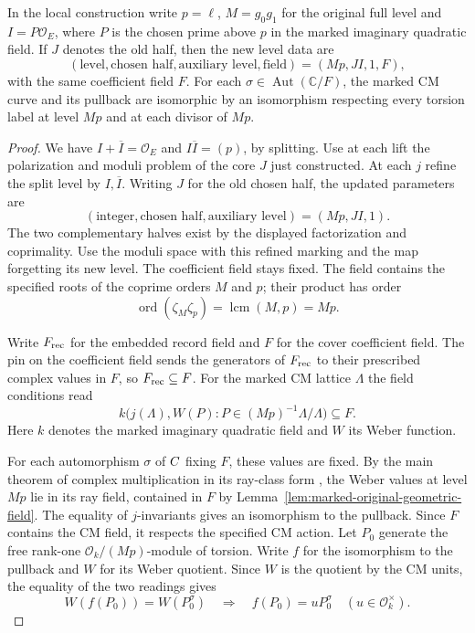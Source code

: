 \begin{established}\label{hyp:split-section-refinement}
In the local construction write \(p=\ell\), \(M=g_0g_1\) for
the original full level and \(I=P\mathcal O_E\), where \(P\)
is the chosen prime above \(p\) in the marked imaginary
quadratic field. If \(J\) denotes the old half, then the new level data are
\[
 (\text{level},\text{chosen half},\text{auxiliary level},\text{field})
                       =(Mp,JI,1,F),
\]
with the same coefficient field \(F\). For each \(\sigma\in\operatorname{Aut}(\mathbb C/F)\), the marked CM curve and its pullback are isomorphic by an isomorphism respecting every torsion label at level \(Mp\) and at each divisor of \(Mp\).
\end{established}
\begin{proof}
We have \(I+\overline I=\mathcal O_E\) and
\(I\overline I=(p)\), by splitting. Use at each lift the
polarization and moduli problem of the core \(J\) just constructed.
At each \(j\) refine the split level by \(I,\overline I\).
Writing \(J\) for the old chosen half, the updated parameters are
\[
 (\text{integer},\text{chosen half},\text{auxiliary level})=(Mp,JI,1).
\] The two complementary halves exist by the displayed
factorization and coprimality. Use the moduli space with this
refined marking and the map forgetting its new level.
The coefficient field stays fixed. The field contains the specified roots of the coprime orders \(M\) and \(p\); their product has order
\[
 \operatorname{ord}(\zeta_M\zeta_p)=\operatorname{lcm}(M,p)=Mp .
\]

Write \(F_{\rm rec}\) for the embedded record field and \(F\) for
the cover coefficient field. The pin on the coefficient field
sends the generators of \(F_{\rm rec}\) to their prescribed complex
values in \(F\), so \(F_{\rm rec}\subseteq F\).
For the marked CM lattice \(\Lambda\) the field conditions read
\[
 k\big(j(\Lambda), W(P):P\in (Mp)^{-1}\Lambda/\Lambda\big)\subseteq F .
\]
Here \(k\) denotes the marked imaginary quadratic field and \(W\) its Weber function. 

For each automorphism
\(\sigma\) of \(C\) fixing \(F\), these values are fixed. By the main theorem of complex multiplication in its ray-class form \cite{cm-reciprocity}, the Weber values at level \(Mp\) lie in its ray field, contained in \(F\) by Lemma~\ref{lem:marked-original-geometric-field}. The equality of \(j\)-invariants gives an isomorphism to the pullback. Since \(F\) contains the CM field, it respects the specified CM action. Let \(P_0\) generate the free rank-one \(\mathcal O_k/(Mp)\)-module of torsion. Write \(f\) for the isomorphism to the pullback and \(W\) for its Weber quotient. Since \(W\) is the quotient by the CM units, the equality of the two readings gives
\[
 W(f(P_0))=W(P_0^\sigma)
 \quad\Longrightarrow\quad f(P_0)=uP_0^\sigma
                  \quad(u\in\mathcal O_k^\times).
\]


\end{proof}
